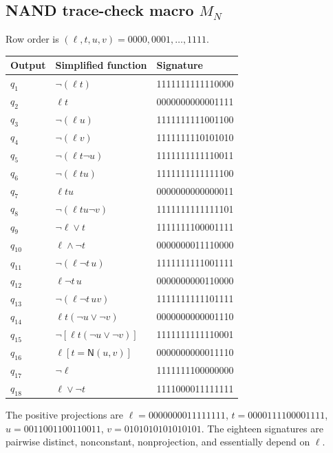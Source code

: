 \documentclass[10.5pt,a4paper]{article}
\newcommand{\NAND}{\mathsf{N}}
\begin{document}
\subsection{NAND trace-check macro \(M_N\)}
Row order is \((\ell,t,u,v)=0000,0001,\ldots,1111\).
\begin{longtable}{lll}
\toprule
Output & Simplified function & Signature\\
\midrule
\(q_1\) & \(\neg(\ell t)\) & 1111111111110000\\
\(q_2\) & \(\ell t\) & 0000000000001111\\
\(q_3\) & \(\neg(\ell u)\) & 1111111111001100\\
\(q_4\) & \(\neg(\ell v)\) & 1111111110101010\\
\(q_5\) & \(\neg(\ell t\neg u)\) & 1111111111110011\\
\(q_6\) & \(\neg(\ell tu)\) & 1111111111111100\\
\(q_7\) & \(\ell tu\) & 0000000000000011\\
\(q_8\) & \(\neg(\ell tu\neg v)\) & 1111111111111101\\
\(q_9\) & \(\neg\ell\vee t\) & 1111111100001111\\
\(q_{10}\) & \(\ell\wedge\neg t\) & 0000000011110000\\
\(q_{11}\) & \(\neg(\ell\neg t\,u)\) & 1111111111001111\\
\(q_{12}\) & \(\ell\neg t\,u\) & 0000000000110000\\
\(q_{13}\) & \(\neg(\ell\neg t\,uv)\) & 1111111111101111\\
\(q_{14}\) & \(\ell t(\neg u\vee\neg v)\) & 0000000000001110\\
\(q_{15}\) & \(\neg[\ell t(\neg u\vee\neg v)]\) & 1111111111110001\\
\(q_{16}\) & \(\ell[t=\NAND(u,v)]\) & 0000000000011110\\
\(q_{17}\) & \(\neg\ell\) & 1111111100000000\\
\(q_{18}\) & \(\ell\vee\neg t\) & 1111000011111111\\
\bottomrule
\end{longtable}
The positive projections are \(\ell=0000000011111111\), \(t=0000111100001111\), \(u=0011001100110011\), \(v=0101010101010101\). The eighteen signatures are pairwise distinct, nonconstant, nonprojection, and essentially depend on \(\ell\).
\end{document}
